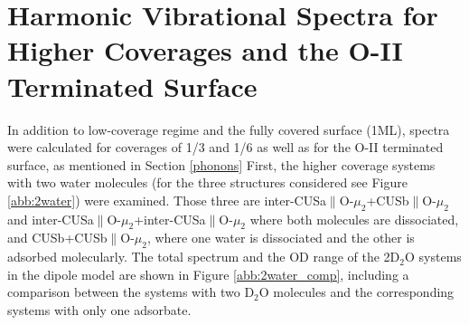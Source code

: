 \documentclass[11pt,DIV=13,BCOR=5mm,a4paper,headinclude]{scrbook}
\begin{document}
\section{Harmonic Vibrational Spectra for Higher Coverages and the O-II Terminated Surface}\label{app:11-20_freq_hig_cov+O-II}
In addition to low-coverage regime and the fully covered surface (1ML), spectra were calculated for coverages of 1/3 and 1/6 as well as for the O-II terminated surface, as mentioned in Section \ref{phonons}
First, the higher coverage systems with two water molecules (for the three structures considered see Figure \ref{abb:2water}) were examined. %
Those three are inter-CUSa$\parallel$O-$\mu_2$+CUSb$\parallel$O-$\mu_2$ and inter-CUSa$\parallel$O-$\mu_2$+inter-CUSa$\parallel$O-$\mu_2$ where both molecules are dissociated, and CUSb+CUSb$\parallel$O-$\mu_2$, where one water is dissociated and the other is adsorbed molecularly.
The total spectrum and the OD range of the 2D$_2$O systems in the dipole model are shown in Figure %
\ref{abb:2water_comp}, including a comparison between the systems with two D$_2$O molecules and the corresponding systems with only one adsorbate.
\end{document}
